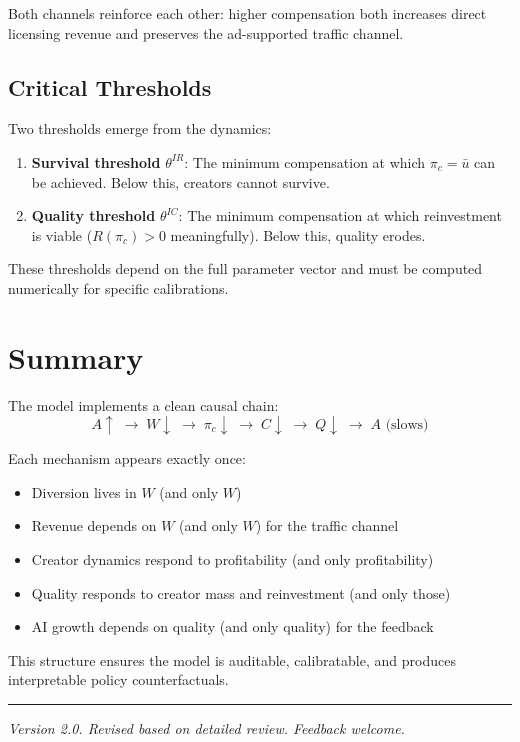 \documentclass[11pt,a4paper]{article}
\begin{document}
Both channels reinforce each other: higher compensation both increases direct licensing revenue and preserves the ad-supported traffic channel.

\subsection{Critical Thresholds}

Two thresholds emerge from the dynamics:

\begin{enumerate}
    \item \textbf{Survival threshold} $\theta^{IR}$: The minimum compensation at which $\pi_c = \bar{u}$ can be achieved. Below this, creators cannot survive.

    \item \textbf{Quality threshold} $\theta^{IC}$: The minimum compensation at which reinvestment is viable ($R(\pi_c) > 0$ meaningfully). Below this, quality erodes.
\end{enumerate}

These thresholds depend on the full parameter vector and must be computed numerically for specific calibrations.

\section{Summary}

The model implements a clean causal chain:
\[
A \uparrow \;\rightarrow\; W \downarrow \;\rightarrow\; \pi_c \downarrow \;\rightarrow\; C \downarrow \;\rightarrow\; Q \downarrow \;\rightarrow\; A \text{ (slows)}
\]

Each mechanism appears exactly once:
\begin{itemize}
    \item Diversion lives in $W$ (and only $W$)
    \item Revenue depends on $W$ (and only $W$) for the traffic channel
    \item Creator dynamics respond to profitability (and only profitability)
    \item Quality responds to creator mass and reinvestment (and only those)
    \item AI growth depends on quality (and only quality) for the feedback
\end{itemize}

This structure ensures the model is auditable, calibratable, and produces interpretable policy counterfactuals.

\vspace{1em}
\hrule
\vspace{0.5em}
\textit{Version 2.0. Revised based on detailed review. Feedback welcome.}
\end{document}
